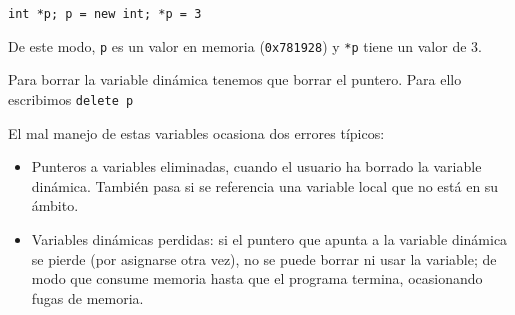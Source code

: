 \documentclass[a4paper]{article}
\begin{document}
	\verb|int *p; p = new int; *p = 3|
	
	De este modo, \verb|p| es un valor en memoria (\verb|0x781928|) y \verb|*p| tiene un valor de 3.
	
	Para borrar la variable dinámica tenemos que borrar el puntero. Para ello escribimos \verb|delete p|
	
	El mal manejo de estas variables ocasiona dos errores típicos:
	\begin{itemize}
		\item Punteros a variables eliminadas, cuando el usuario ha borrado la variable dinámica. También pasa si se referencia una variable local que no está en su ámbito.
		\item Variables dinámicas perdidas: si el puntero que apunta a la variable dinámica se pierde (por asignarse otra vez), no se puede borrar ni usar la variable; de modo que consume memoria hasta que el programa termina, ocasionando fugas de memoria. 
	\end{itemize}
	
	
\end{document}
